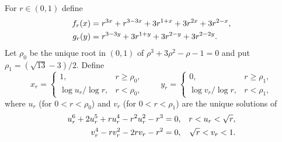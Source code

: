 \documentclass[11pt,a4paper]{article}
\theoremstyle{definition}\newtheorem{definition}[theorem]{Definition}
\theoremstyle{remark}\newtheorem{remark}[theorem]{Remark}
\begin{document}
For $r\in(0,1)$ define
\begin{align}\label{eq:FG}
 f_r(x)&=r^{3x}+r^{3-3x}+3r^{1+x}+3r^{2x}+3r^{2-x},\\
 g_r(y)&=r^{3-3y}+3r^{1+y}+3r^{2-y}+3r^{2-2y}.\notag
\end{align}
Let $\rho_0$ be the unique root in $(0,1)$ of $\rho^3+3\rho^2-\rho-1=0$ and put $\rho_1=(\sqrt{13}-3)/2$. Define
\begin{equation}\label{eq:xy}
x_r=\begin{cases}
1,&r\ge \rho_0,\\
\log u_r/\log r,&r<\rho_0,
\end{cases}
\qquad
y_r=\begin{cases}
0,&r\ge \rho_1,\\
\log v_r/\log r,&r<\rho_1,
\end{cases}
\end{equation}
where $u_r$ (for $0<r<\rho_0$) and $v_r$ (for $0<r<\rho_1$) are the unique solutions of
\begin{align}\label{eq:polys}
u_r^6+2u_r^5+ru_r^4-r^2u_r^2-r^3&=0,& r<u_r<\sqrt r,\\
v_r^4-rv_r^2-2rv_r-r^2&=0,& \sqrt r<v_r<1.\notag
\end{align}
\end{document}
